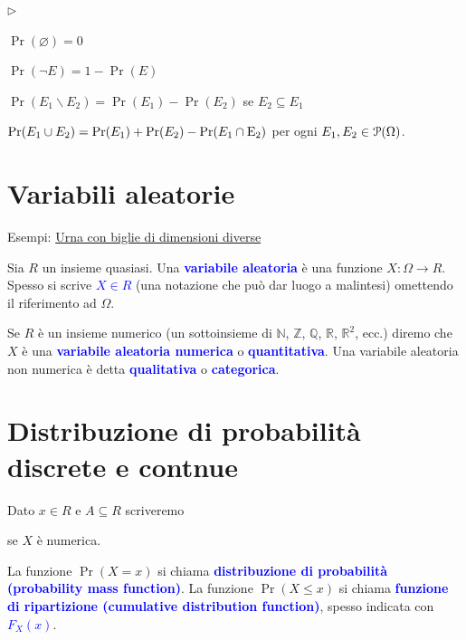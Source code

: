 \documentclass[12pt,openany]{book}
\def\RR{\mathds R}
\def\ZZ{\mathds Z}
\def\NN{\mathds N}
\def\QQ{\mathds Q}
\def\P{\EuScript P}
\def\0{\varnothing}
\def\E{{\rm E}}
\newcommand{\mylabel}[1]{{\footnotesize\textsf{#1}}\hfill}
\renewenvironment{itemize}
  {\begin{list}{$\triangleright$}{%
   \setlength{\parskip}{0mm}
   \setlength{\topsep}{.2\baselineskip}
   \setlength{\rightmargin}{0mm}
   \setlength{\listparindent}{0mm}
   \setlength{\itemindent}{0mm}
   \setlength{\labelwidth}{3ex}
   \setlength{\itemsep}{.4\baselineskip}
   \setlength{\parsep}{0mm}
   \setlength{\partopsep}{0mm}
   \setlength{\labelsep}{1ex}
   \setlength{\leftmargin}{\labelwidth+\labelsep}
   \let\makelabel\mylabel}}{%
   \end{list}\vspace*{-1.3mm}}
\def\emph#1{\textcolor{blue}{\textbf{\boldmath #1}}}
\theoremstyle{mio}
\theoremstyle{liscio}
\begin{document}
\begin{itemize}
\item $\Pr(\0)=0$
\item $\Pr(\neg E)=1-\Pr(E)$
\item $\Pr(E_1\smallsetminus E_2)=\Pr(E_1)-\Pr(E_2)$ se $E_2\subseteq E_1$
\item $\Pr(E_1\cup E_2)=\Pr(E_1)+\Pr(E_2)-\Pr(E_1\cap\E_2)$ per ogni $E_1,E_2\in\P(\Omega)$.
\end{itemize}

\hfill{}\clearpage\section{Variabili aleatorie}

{\color{brown}Esempi: \hyperref[Urna_biglie_diverse]{Urna con biglie di dimensioni diverse \faShare}}

Sia $R$ un insieme quasiasi. Una \emph{variabile aleatoria\/} è una funzione $X:\Omega\to R$. Spesso si scrive \emph{$X\in R$\/} (una notazione che può dar luogo a malintesi) omettendo il riferimento ad $\Omega$.

Se $R$ è un insieme numerico (un sottoinsieme di $\NN$, $\ZZ$, $\QQ$, $\RR$, $\RR^2$, ecc.) diremo che $X$ è una \emph{variabile aleatoria numerica\/} o \emph{quantitativa}. Una variabile aleatoria non numerica è detta \emph{qualitativa\/} o \emph{categorica}.


\hfill{}\clearpage\section{Distribuzione di probabilità discrete e contnue}

Dato $x\in R$ e $A\subseteq R$ scriveremo

\ceq{\hfill \emph{$p_x$}\medrel{=}\emph{$\Pr(X=x)$}}{=}{\Pr\big(\{\omega\in\Omega\ :\ X(\omega)=x\}\big)}

\ceq{\hfill \emph{$\Pr(X\in A)$}}{=}{\Pr\big(\{\omega\in\Omega\ :\ X(\omega)\in A\}\big)}

\ceq{\hfill \emph{$F_X(x)$}\medrel{=}\emph{$\Pr(X \le x$)}}{=}{\Pr\big(\{\omega\in\Omega\ :\ X(\omega)\le x\}\big)}\hfill  se $X$ \`e numerica.

La funzione $\Pr(X=x)$ si chiama \emph{distribuzione di probabilità (probability mass function)}. La funzione $\Pr(X \le x)$ si chiama  \emph{funzione di ripartizione (cumulative distribution function)}, spesso indicata con \emph{$F_X(x)$}.
\end{document}
